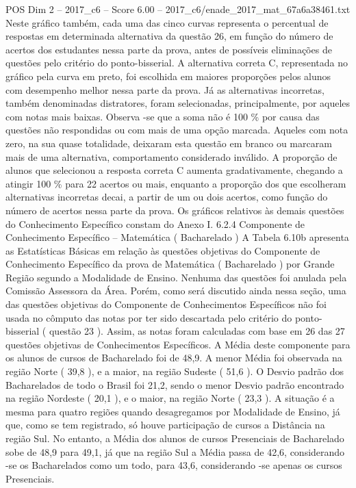 \begin{textsample}{POS Dim 2 – 2017\_c6 – Score 6.00 – 2017\_c6/enade\_2017\_mat\_67a6a38461.txt}
Neste gráfico também, cada uma das cinco curvas representa o percentual de respostas em determinada alternativa da questão 26, em função do número de acertos dos estudantes nessa parte da prova, antes de possíveis eliminações de questões pelo critério do ponto-bisserial.
A alternativa correta C, representada no gráfico pela curva em preto, foi escolhida em maiores proporções pelos alunos com desempenho melhor nessa parte da prova.
Já as alternativas incorretas, também denominadas distratores, foram selecionadas, principalmente, por aqueles com notas mais baixas.
Observa -se que a soma não é 100 \% por causa das questões não respondidas ou com mais de uma opção marcada.
Aqueles com nota zero, na sua quase totalidade, deixaram esta questão em branco ou marcaram mais de uma alternativa, comportamento considerado inválido.
A proporção de alunos que selecionou a resposta correta C aumenta gradativamente, chegando a atingir 100 \% para 22 acertos ou mais, enquanto a proporção dos que escolheram alternativas incorretas decai, a partir de um ou dois acertos, como função do número de acertos nessa parte da prova.
Os gráficos relativos às demais questões do Conhecimento Específico constam do Anexo I. 6.2.4 Componente de Conhecimento Específico – Matemática ( Bacharelado ) A Tabela 6.10b apresenta as Estatísticas Básicas em relação às questões objetivas do Componente de Conhecimento Específico da prova de Matemática ( Bacharelado ) por Grande Região segundo a Modalidade de Ensino.
Nenhuma das questões foi anulada pela Comissão Assessora da Área.
Porém, como será discutido ainda nessa seção, uma das questões objetivas do Componente de Conhecimentos Específicos não foi usada no cômputo das notas por ter sido descartada pelo critério do ponto-bisserial ( questão 23 ).
Assim, as notas foram calculadas com base em 26 das 27 questões objetivas de Conhecimentos Específicos.
A Média deste componente para os alunos de cursos de Bacharelado foi de 48,9.
A menor Média foi observada na região Norte ( 39,8 ), e a maior, na região Sudeste ( 51,6 ).
O Desvio padrão dos Bacharelados de todo o Brasil foi 21,2, sendo o menor Desvio padrão encontrado na região Nordeste ( 20,1 ), e o maior, na região Norte ( 23,3 ).
A situação é a mesma para quatro regiões quando desagregamos por Modalidade de Ensino, já que, como se tem registrado, só houve participação de cursos a Distância na região Sul.
No entanto, a Média dos alunos de cursos Presenciais de Bacharelado sobe de 48,9 para 49,1, já que na região Sul a Média passa de 42,6, considerando -se os Bacharelados como um todo, para 43,6, considerando -se apenas os cursos Presenciais.

\end{textsample}
